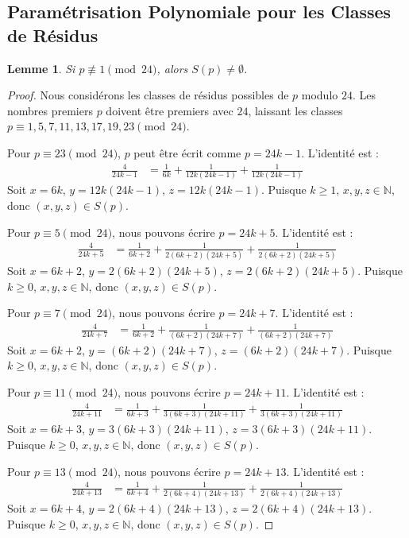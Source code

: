 \documentclass[12pt,a4paper]{article}
\newtheorem{lemma}[theorem]{Lemme}
\begin{document}
\subsection{Param\'etrisation Polynomiale pour les Classes de R\'esidus}
\begin{lemma} \label{lem:res_class}
Si $p \not\equiv 1 \pmod{24}$, alors $S(p) \neq \emptyset$.
\end{lemma}
\begin{proof}
Nous consid\'erons les classes de r\'esidus possibles de $p$ modulo $24$. Les nombres premiers $p$ doivent \^etre premiers avec $24$, laissant les classes $p \equiv 1, 5, 7, 11, 13, 17, 19, 23 \pmod{24}$.

Pour $p \equiv 23 \pmod{24}$, $p$ peut \^etre \'ecrit comme $p = 24k - 1$. L'identit\'e est :
\begin{align}
\frac{4}{24k-1} &= \frac{1}{6k} + \frac{1}{12k(24k-1)} + \frac{1}{12k(24k-1)}
\end{align}
Soit $x = 6k$, $y = 12k(24k-1)$, $z = 12k(24k-1)$. Puisque $k \ge 1$, $x, y, z \in \mathbb{N}$, donc $(x, y, z) \in S(p)$.

Pour $p \equiv 5 \pmod{24}$, nous pouvons \'ecrire $p = 24k + 5$. L'identit\'e est :
\begin{align}
\frac{4}{24k+5} &= \frac{1}{6k+2} + \frac{1}{2(6k+2)(24k+5)} + \frac{1}{2(6k+2)(24k+5)}
\end{align}
Soit $x = 6k+2$, $y = 2(6k+2)(24k+5)$, $z = 2(6k+2)(24k+5)$. Puisque $k \ge 0$, $x,y,z \in \mathbb{N}$, donc $(x,y,z) \in S(p)$.

Pour $p \equiv 7 \pmod{24}$, nous pouvons \'ecrire $p = 24k + 7$. L'identit\'e est :
\begin{align}
\frac{4}{24k+7} &= \frac{1}{6k+2} + \frac{1}{(6k+2)(24k+7)} + \frac{1}{(6k+2)(24k+7)}
\end{align}
Soit $x = 6k+2$, $y = (6k+2)(24k+7)$, $z = (6k+2)(24k+7)$. Puisque $k \ge 0$, $x,y,z \in \mathbb{N}$, donc $(x,y,z) \in S(p)$.

Pour $p \equiv 11 \pmod{24}$, nous pouvons \'ecrire $p = 24k + 11$. L'identit\'e est :
\begin{align}
\frac{4}{24k+11} &= \frac{1}{6k+3} + \frac{1}{3(6k+3)(24k+11)} + \frac{1}{3(6k+3)(24k+11)}
\end{align}
Soit $x = 6k+3$, $y = 3(6k+3)(24k+11)$, $z = 3(6k+3)(24k+11)$. Puisque $k \ge 0$, $x,y,z \in \mathbb{N}$, donc $(x,y,z) \in S(p)$.

Pour $p \equiv 13 \pmod{24}$, nous pouvons \'ecrire $p = 24k + 13$. L'identit\'e est :
\begin{align}
\frac{4}{24k+13} &= \frac{1}{6k+4} + \frac{1}{2(6k+4)(24k+13)} + \frac{1}{2(6k+4)(24k+13)}
\end{align}
Soit $x = 6k+4$, $y = 2(6k+4)(24k+13)$, $z = 2(6k+4)(24k+13)$. Puisque $k \ge 0$, $x,y,z \in \mathbb{N}$, donc $(x,y,z) \in S(p)$.


\end{proof}
\end{document}
